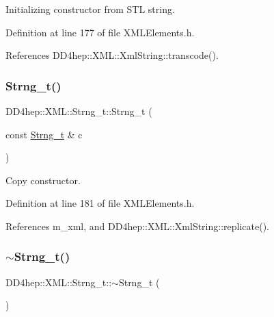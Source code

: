 Initializing constructor from S\+TL string. 



Definition at line 177 of file X\+M\+L\+Elements.\+h.



References D\+D4hep\+::\+X\+M\+L\+::\+Xml\+String\+::transcode().

\hypertarget{class_d_d4hep_1_1_x_m_l_1_1_strng__t_a44f256b1244bd55f56668be6df3550c9}{}\label{class_d_d4hep_1_1_x_m_l_1_1_strng__t_a44f256b1244bd55f56668be6df3550c9} 
\subsubsection{\texorpdfstring{Strng\+\_\+t()}{Strng\_t()}\hspace{0.1cm}{\footnotesize\ttfamily [4/4]}}
{\footnotesize\ttfamily D\+D4hep\+::\+X\+M\+L\+::\+Strng\+\_\+t\+::\+Strng\+\_\+t (\begin{DoxyParamCaption}\item[{const \hyperlink{class_d_d4hep_1_1_x_m_l_1_1_strng__t}{Strng\+\_\+t} \&}]{c }\end{DoxyParamCaption})\hspace{0.3cm}{\ttfamily [inline]}}



Copy constructor. 



Definition at line 181 of file X\+M\+L\+Elements.\+h.



References m\+\_\+xml, and D\+D4hep\+::\+X\+M\+L\+::\+Xml\+String\+::replicate().

\hypertarget{class_d_d4hep_1_1_x_m_l_1_1_strng__t_a0538fed420113f555a2f8ec389b131df}{}\label{class_d_d4hep_1_1_x_m_l_1_1_strng__t_a0538fed420113f555a2f8ec389b131df} 
\subsubsection{\texorpdfstring{$\sim$\+Strng\+\_\+t()}{~Strng\_t()}}
{\footnotesize\ttfamily D\+D4hep\+::\+X\+M\+L\+::\+Strng\+\_\+t\+::$\sim$\+Strng\+\_\+t (\begin{DoxyParamCaption}{ }\end{DoxyParamCaption})\hspace{0.3cm}{\ttfamily [inline]}}



